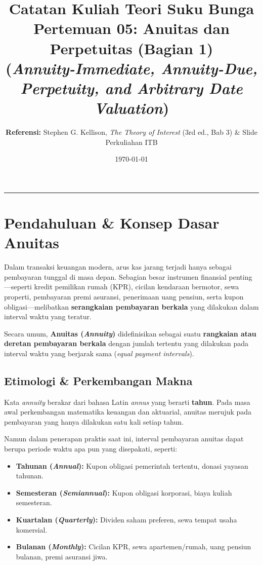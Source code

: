 \documentclass[11pt,a4paper]{article}
\title{\textbf{\LARGE Catatan Kuliah Teori Suku Bunga}\\[0.3em]
\Large Pertemuan 05: Anuitas dan Perpetuitas (Bagian 1)\\
\large (\textit{Annuity-Immediate, Annuity-Due, Perpetuity, and Arbitrary Date Valuation})}
\author{\textbf{Referensi:} Stephen G. Kellison, \textit{The Theory of Interest} (3rd ed., Bab 3) \& Slide Perkuliahan ITB}
\date{\today}
\begin{document}
\maketitle
\tableofcontents
\vspace{1em}
\noindent\rule{\textwidth}{0.4pt}
\vspace{1.5em}

\section{Pendahuluan \& Konsep Dasar Anuitas}

Dalam transaksi keuangan modern, arus kas jarang terjadi hanya sebagai pembayaran tunggal di masa depan. Sebagian besar instrumen finansial penting—seperti kredit pemilikan rumah (KPR), cicilan kendaraan bermotor, sewa properti, pembayaran premi asuransi, penerimaan uang pensiun, serta kupon obligasi—melibatkan \textbf{serangkaian pembayaran berkala} yang dilakukan dalam interval waktu yang teratur.

\begin{definitionbox}
Secara umum, \textbf{Anuitas (\textit{Annuity})} didefinisikan sebagai suatu \textbf{rangkaian atau deretan pembayaran berkala} dengan jumlah tertentu yang dilakukan pada interval waktu yang berjarak sama (\textit{equal payment intervals}).
\end{definitionbox}

\subsection{Etimologi \& Perkembangan Makna}
Kata \textit{annuity} berakar dari bahasa Latin \textit{annus} yang berarti \textbf{tahun}. Pada masa awal perkembangan matematika keuangan dan aktuarial, anuitas merujuk pada pembayaran yang hanya dilakukan satu kali setiap tahun. 

Namun dalam penerapan praktis saat ini, interval pembayaran anuitas dapat berupa periode waktu apa pun yang disepakati, seperti:
\begin{itemize}[leftmargin=1.5em]
    \item \textbf{Tahunan (\textit{Annual}):} Kupon obligasi pemerintah tertentu, donasi yayasan tahunan.
    \item \textbf{Semesteran (\textit{Semiannual}):} Kupon obligasi korporasi, biaya kuliah semesteran.
    \item \textbf{Kuartalan (\textit{Quarterly}):} Dividen saham preferen, sewa tempat usaha komersial.
    \item \textbf{Bulanan (\textit{Monthly}):} Cicilan KPR, sewa apartemen/rumah, uang pensiun bulanan, premi asuransi jiwa.
\end{itemize}
\end{document}
